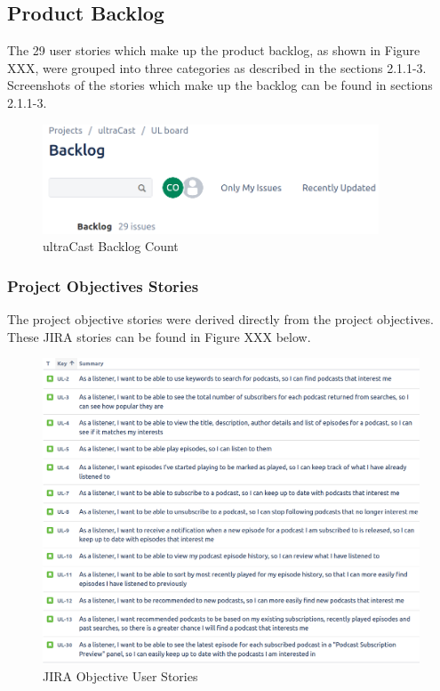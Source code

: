 \documentclass[12pt]{article}
\begin{document}
\subsection{Product Backlog}

The 29 user stories which make up the product backlog, as shown in Figure XXX, were grouped into three categories as described in the sections 2.1.1-3.
Screenshots of the stories which make up the backlog can be found in sections 2.1.1-3.

\begin{figure}[h]
    \centering
    \includegraphics[width=10cm]{resources/project_backlog}
    \caption{ultraCast Backlog Count}
    \label{fig:background}
\end{figure}

\subsubsection{Project Objectives Stories}

The project objective stories were derived directly from the project objectives. These JIRA stories can be found in Figure XXX below.

\begin{figure}[h]
    \centering
    \includegraphics[width=\textwidth]{resources/objective_stories}
    \caption{JIRA Objective User Stories}
    \label{fig:background}
\end{figure}
\end{document}
